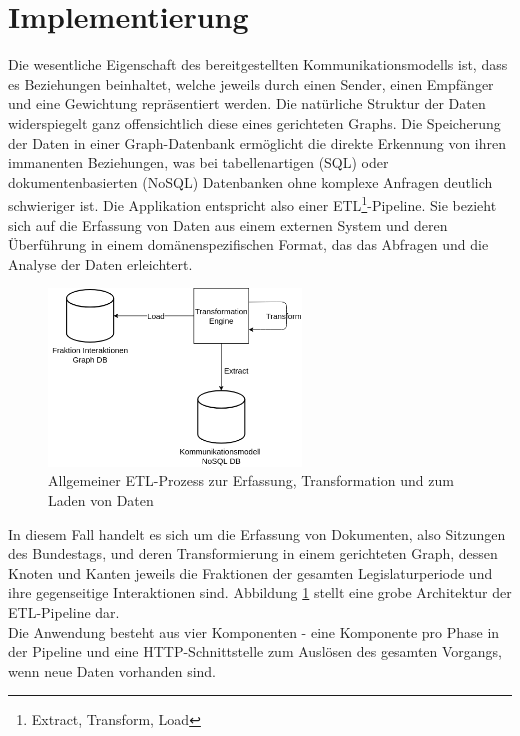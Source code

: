 \section{Implementierung}\label{sec:06_04_implementierung}
Die wesentliche Eigenschaft des bereitgestellten Kommunikationsmodells ist, dass es Beziehungen beinhaltet, welche jeweils durch einen Sender, einen Empfänger und eine 
Gewichtung repräsentiert werden. 
Die natürliche Struktur der Daten widerspiegelt ganz offensichtlich diese eines gerichteten Graphs. 
Die Speicherung der Daten in einer Graph-Datenbank ermöglicht die direkte Erkennung von ihren immanenten Beziehungen, was bei tabellenartigen (SQL) oder dokumentenbasierten (NoSQL) Datenbanken ohne komplexe Anfragen deutlich schwieriger ist. 
Die Applikation entspricht also einer ETL\footnote{Extract, Transform, Load}-Pipeline. Sie bezieht sich auf die Erfassung von Daten aus einem externen System und deren Überführung in einem domänenspezifischen
Format, das das Abfragen und die Analyse der Daten erleichtert. 
\begin{figure}[H]
    \centering
    \includegraphics[width=0.60\textwidth]{images/ETL_Factions.png}
    \caption{Allgemeiner ETL-Prozess zur Erfassung, Transformation und zum Laden von Daten}
    \label{fig:faction-etl}
\end{figure}
In diesem Fall handelt es sich um die Erfassung von Dokumenten, also Sitzungen des Bundestags, und deren Transformierung in einem gerichteten Graph, dessen Knoten und Kanten jeweils die 
Fraktionen der gesamten Legislaturperiode und ihre gegenseitige Interaktionen sind. Abbildung \ref{fig:faction-etl} stellt eine grobe Architektur der ETL-Pipeline dar.\\
Die Anwendung besteht aus vier Komponenten - eine Komponente pro Phase in der Pipeline und eine HTTP-Schnittstelle zum Auslösen des gesamten Vorgangs, wenn neue Daten vorhanden sind.
